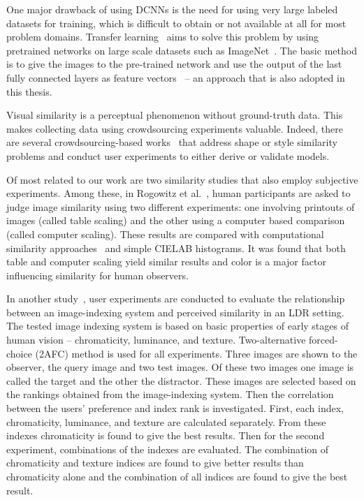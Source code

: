 One major drawback of using DCNNs is the need for using very large labeled datasets for training, which is difficult to obtain or not available at all for most problem domains. Transfer learning~\cite{yosinski2014transferable} aims to solve this problem by using pretrained networks on large scale datasets such as ImageNet~\cite{russakovsky2015imagenet}. The basic method is to give the images to the pre-trained network and use the output of the last fully connected layers as feature vectors~\cite{donahue2014decaf,wan2014deep} -- an approach that is also adopted in this thesis.

Visual similarity is a perceptual phenomenon without ground-truth data. This makes collecting data using crowdsourcing experiments valuable. Indeed, there are several crowdsourcing-based works~\cite{lun2015elements,saleh2015learning,kleiman2016toward} that address shape or style similarity problems and conduct user experiments to either derive or validate models. 

Of most related to our work are two similarity studies that also employ subjective experiments. Among these, in Rogowitz et al.~\cite{rogowitz1998perceptual}, human participants are asked to judge image similarity using two different experiments: one involving printouts of images (called table scaling) and the other using a computer based comparison (called computer scaling). These results are compared with computational similarity approaches~\cite{frese1997methodology} and simple CIELAB histograms. It was found that both table and computer scaling yield similar results and color is a major factor influencing similarity for human observers.

In another study~\cite{neumann2006image}, user experiments are conducted to evaluate the relationship between an image-indexing system and perceived similarity in an LDR setting. The tested image indexing system is based on basic properties of early stages of human vision -- chromaticity, luminance, and texture. Two-alternative forced-choice (2AFC) method is used for all experiments. Three images are shown to the observer, the query image and two test images. Of these two images one image is called the target and the other the distractor. These images are selected based on the rankings obtained from the image-indexing system. Then the correlation between the users' preference and index rank is investigated. First, each index, chromaticity, luminance, and texture are calculated separately. From these indexes chromaticity is found to give the best results. Then for the second experiment, combinations of the indexes are evaluated. The combination of chromaticity and texture indices are found to give better results than chromaticity alone and the combination of all indices are found to give the best result.


